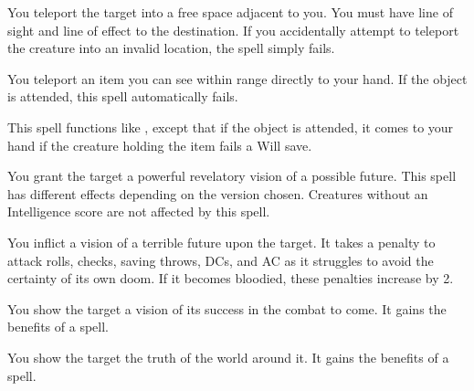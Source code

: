 \spellrng{\rngmed}
\begin{spelleffect}
    You teleport the target into a free space adjacent to you. You must have line of sight and line of effect to the destination. If you accidentally attempt to teleport the creature into an invalid location, the spell simply fails.
\end{spelleffect}

\spellrng{\rngclose}
\begin{spelleffect}
  You teleport an item you can see within range directly to your hand. If the object is attended, this spell automatically fails.
\end{spelleffect}

\spellrng{\rngmed}
\begin{spelleffect}
  This spell functions like , except that if the object is attended, it comes to your hand if the creature holding the item fails a Will save.
\end{spelleffect}

\spellrng{\rngmed}
\spelldur{\durshort}
\begin{spelleffect}
  You grant the target a powerful revelatory vision of a possible future. This spell has different effects depending on the version chosen. Creatures without an Intelligence score are not affected by this spell.
  \par {} You inflict a vision of a terrible future upon the target. It takes a  penalty to attack rolls, checks, saving throws, DCs, and AC as it struggles to avoid the certainty of its own doom. If it becomes bloodied, these penalties increase by 2.
  \par {} You show the target a vision of its success in the combat to come. It gains the benefits of a  spell.
  \par {} You show the target the truth of the world around it. It gains the benefits of a  spell.
\end{spelleffect}

